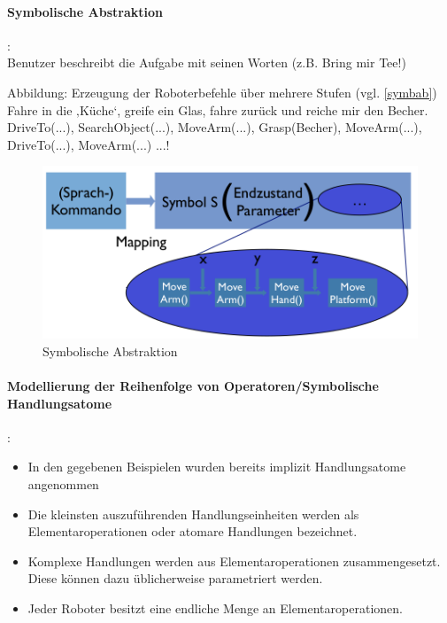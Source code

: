 \paragraph*{Symbolische Abstraktion}:\\
Benutzer beschreibt die Aufgabe mit seinen Worten (z.B. \glqq Bring mir Tee!\grqq) 
\begin{itemize}
\ita Abbildung: Erzeugung der Roboterbefehle über mehrere Stufen (vgl. \autoref{symbab})
\ita \glqq Fahre in die ‚Küche‘, greife ein Glas, fahre zurück und reiche mir den Becher.\grqq
\ita \glqq DriveTo(...), SearchObject(...), MoveArm(...), Grasp(Becher), MoveArm(...), DriveTo(...), MoveArm(...) ...!\grqq
\end{itemize}
\begin{figure}[h!]\centering 
\includegraphics[width=0.6\linewidth]{figures/ch02_symbab.png}
\caption{Symbolische Abstraktion}
\label{symbab}
\end{figure}
\paragraph*{Modellierung der Reihenfolge von Operatoren/Symbolische Handlungsatome}:
\begin{itemize}
\item In den gegebenen Beispielen wurden bereits implizit Handlungsatome angenommen
\item Die kleinsten auszuführenden Handlungseinheiten werden als
Elementaroperationen oder atomare Handlungen bezeichnet.
\item Komplexe Handlungen werden aus Elementaroperationen zusammengesetzt. Diese
können dazu üblicherweise parametriert werden.
\item Jeder Roboter besitzt eine endliche Menge an Elementaroperationen.
\end{itemize}
